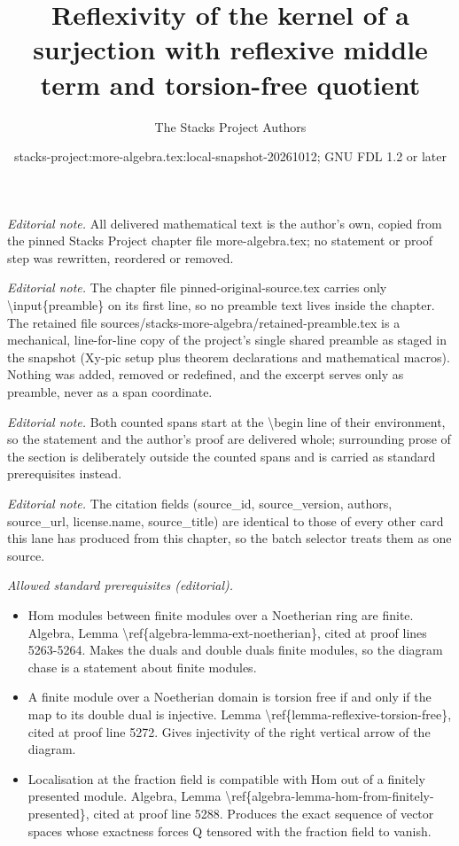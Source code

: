 \documentclass[10pt,a4paper]{amsart}
\title{Reflexivity of the kernel of a surjection with reflexive middle term and torsion-free quotient}
\author{The Stacks Project Authors}
\date{stacks-project:more-algebra.tex:local-snapshot-20261012; GNU FDL 1.2 or later}
\theoremstyle{plain}
\theoremstyle{definition}
\theoremstyle{remark}
\numberwithin{equation}{subsection}
\begin{document}
\maketitle
\setcounter{subsection}{1}
\noindent\textit{Editorial note.} All delivered mathematical text is the author's own, copied from the pinned Stacks Project chapter file more-algebra.tex; no statement or proof step was rewritten, reordered or removed.\par\medskip
\noindent\textit{Editorial note.} The chapter file pinned-original-source.tex carries only \textbackslash{}input\{preamble\} on its first line, so no preamble text lives inside the chapter. The retained file sources/stacks-more-algebra/retained-preamble.tex is a mechanical, line-for-line copy of the project's single shared preamble as staged in the snapshot (Xy-pic setup plus theorem declarations and mathematical macros). Nothing was added, removed or redefined, and the excerpt serves only as preamble, never as a span coordinate.\par\medskip
\noindent\textit{Editorial note.} Both counted spans start at the \textbackslash{}begin line of their environment, so the statement and the author's proof are delivered whole; surrounding prose of the section is deliberately outside the counted spans and is carried as standard prerequisites instead.\par\medskip
\noindent\textit{Editorial note.} The citation fields (source\_id, source\_version, authors, source\_url, license.name, source\_title) are identical to those of every other card this lane has produced from this chapter, so the batch selector treats them as one source.\par\medskip
\noindent\textit{Allowed standard prerequisites (editorial).}\begin{itemize}
\item Hom modules between finite modules over a Noetherian ring are finite. Algebra, Lemma \textbackslash{}ref\{algebra-lemma-ext-noetherian\}, cited at proof lines 5263-5264. Makes the duals and double duals finite modules, so the diagram chase is a statement about finite modules.
\item A finite module over a Noetherian domain is torsion free if and only if the map to its double dual is injective. Lemma \textbackslash{}ref\{lemma-reflexive-torsion-free\}, cited at proof line 5272. Gives injectivity of the right vertical arrow of the diagram.
\item Localisation at the fraction field is compatible with Hom out of a finitely presented module. Algebra, Lemma \textbackslash{}ref\{algebra-lemma-hom-from-finitely-presented\}, cited at proof line 5288. Produces the exact sequence of vector spaces whose exactness forces Q tensored with the fraction field to vanish.
\end{itemize}\medskip
\end{document}

